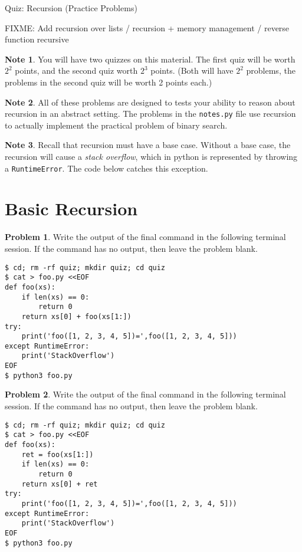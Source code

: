 \documentclass[10pt]{article}
\theoremstyle{definition}
\newtheorem{problem}{Problem}
\newtheorem{note}{Note}
\begin{document}
\begin{center}
    {
\Large
    Quiz: Recursion (Practice Problems)

    FIXME: Add recursion over lists / recursion + memory management / reverse function recursive
}

    \vspace{0.1in}
\end{center}

\begin{note}
    You will have two quizzes on this material.
    The first quiz will be worth $2^2$ points,
    and the second quiz worth $2^3$ points.
    (Both will have $2^2$ problems,
    the problems in the second quiz will be worth 2 points each.)
\end{note}

\begin{note}
    All of these problems are designed to tests your ability to reason about recursion in an abstract setting.
    The problems in the \texttt{notes.py} file use recursion to actually implement the practical problem of binary search.
\end{note}

\begin{note}
    Recall that recursion must have a base case.
    Without a base case, the recursion will cause a \emph{stack overflow},
    which in python is represented by throwing a \texttt{RuntimeError}.
    The code below catches this exception.
\end{note}

\filbreak
\section{Basic Recursion}

\begin{problem}
    Write the output of the final command in the following terminal session.
    If the command has no output, then leave the problem blank.
\end{problem}
\begin{lstlisting}
$ cd; rm -rf quiz; mkdir quiz; cd quiz
$ cat > foo.py <<EOF
def foo(xs):
    if len(xs) == 0:
        return 0
    return xs[0] + foo(xs[1:])
try:
    print('foo([1, 2, 3, 4, 5])=',foo([1, 2, 3, 4, 5]))
except RuntimeError:
    print('StackOverflow')
EOF
$ python3 foo.py
\end{lstlisting}

\begin{problem}
    Write the output of the final command in the following terminal session.
    If the command has no output, then leave the problem blank.
\end{problem}
\begin{lstlisting}
$ cd; rm -rf quiz; mkdir quiz; cd quiz
$ cat > foo.py <<EOF
def foo(xs):
    ret = foo(xs[1:])
    if len(xs) == 0:
        return 0
    return xs[0] + ret
try:
    print('foo([1, 2, 3, 4, 5])=',foo([1, 2, 3, 4, 5]))
except RuntimeError:
    print('StackOverflow')
EOF
$ python3 foo.py
\end{lstlisting}
\end{document}
